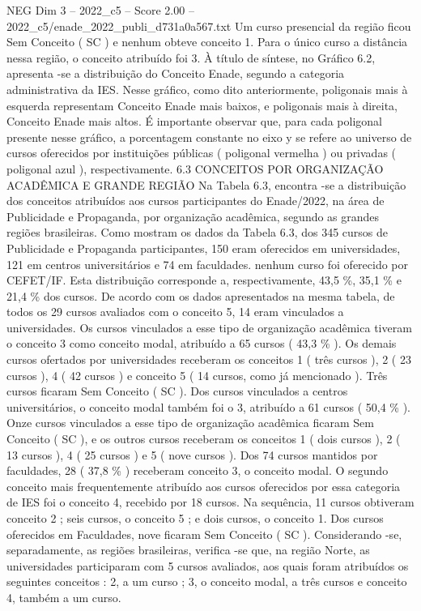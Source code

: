 \begin{textsample}{NEG Dim 3 – 2022\_c5 – Score 2.00 – 2022\_c5/enade\_2022\_publi\_d731a0a567.txt}
Um curso presencial da região ficou Sem Conceito ( SC ) e nenhum obteve conceito 1.
Para o único curso a distância nessa região, o conceito atribuído foi 3.
À título de síntese, no Gráfico 6.2, apresenta -se a distribuição do Conceito Enade, segundo a categoria administrativa da IES.
Nesse gráfico, como dito anteriormente, poligonais mais à esquerda representam Conceito Enade mais baixos, e poligonais mais à direita, Conceito Enade mais altos.
É importante observar que, para cada poligonal presente nesse gráfico, a porcentagem constante no eixo y se refere ao universo de cursos oferecidos por instituições públicas ( poligonal vermelha ) ou privadas ( poligonal azul ), respectivamente. 6.3 CONCEITOS POR ORGANIZAÇÃO ACADÊMICA E GRANDE REGIÃO Na Tabela 6.3, encontra -se a distribuição dos conceitos atribuídos aos cursos participantes do Enade/2022, na área de Publicidade e Propaganda, por organização acadêmica, segundo as grandes regiões brasileiras.
Como mostram os dados da Tabela 6.3, dos 345 cursos de Publicidade e Propaganda participantes, 150 eram oferecidos em universidades, 121 em centros universitários e 74 em faculdades. nenhum curso foi oferecido por CEFET/IF.
Esta distribuição corresponde a, respectivamente, 43,5 \%, 35,1 \% e 21,4 \% dos cursos.
De acordo com os dados apresentados na mesma tabela, de todos os 29 cursos avaliados com o conceito 5, 14 eram vinculados a universidades.
Os cursos vinculados a esse tipo de organização acadêmica tiveram o conceito 3 como conceito modal, atribuído a 65 cursos ( 43,3 \% ).
Os demais cursos ofertados por universidades receberam os conceitos 1 ( três cursos ), 2 ( 23 cursos ), 4 ( 42 cursos ) e conceito 5 ( 14 cursos, como já mencionado ).
Três cursos ficaram Sem Conceito ( SC ).
Dos cursos vinculados a centros universitários, o conceito modal também foi o 3, atribuído a 61 cursos ( 50,4 \% ).
Onze cursos vinculados a esse tipo de organização acadêmica ficaram Sem Conceito ( SC ), e os outros cursos receberam os conceitos 1 ( dois cursos ), 2 ( 13 cursos ), 4 ( 25 cursos ) e 5 ( nove cursos ).
Dos 74 cursos mantidos por faculdades, 28 ( 37,8 \% ) receberam conceito 3, o conceito modal.
O segundo conceito mais frequentemente atribuído aos cursos oferecidos por essa categoria de IES foi o conceito 4, recebido por 18 cursos.
Na sequência, 11 cursos obtiveram conceito 2 ; seis cursos, o conceito 5 ; e dois cursos, o conceito 1.
Dos cursos oferecidos em Faculdades, nove ficaram Sem Conceito ( SC ).
Considerando -se, separadamente, as regiões brasileiras, verifica -se que, na região Norte, as universidades participaram com 5 cursos avaliados, aos quais foram atribuídos os seguintes conceitos : 2, a um curso ; 3, o conceito modal, a três cursos e conceito 4, também a um curso.

\end{textsample}
